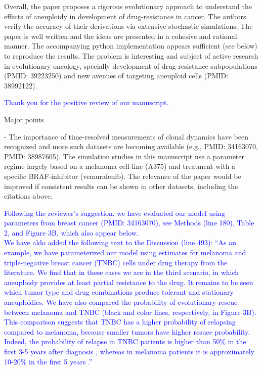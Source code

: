 \documentclass[12pt]{extarticle}
\begin{document}

Overall, the paper proposes a rigorous evolutionary approach to understand the effects of aneuploidy in development of drug-resistance in cancer. The authors verify the accuracy of their derivations via extensive stochastic simulations. The paper is well written and the ideas are presented in a cohesive and rational manner. The accompanying python implementation appears sufficient (see below) to reproduce the results. The problem is interesting and subject of active research in evolutionary oncology, specially development of drug-resistance subpopulations (PMID: 39223250) and new avenues of targeting aneuploid cells (PMID: 38992122).

\textcolor{blue}{Thank you for the positive review of our manuscript.}

Major points

- The importance of time-resolved measurements of clonal dynamics have been recognized and more such datasets are becoming available (e.g., PMID: 34163070, PMID: 38987605). The simulation studies in this manuscript use a parameter regime largely based on a melanoma cell-line (A375) and treatment with a specific BRAF-inhibitor (vemurafenib). The relevance of the paper would be improved if consistent results can be shown in other datasets, including the citations above.

\textcolor{blue}{Following the reviewer's suggestion, we have evaluated our model using parameters from breast cancer (PMID: 34163070), see Methods (line 180), Table 2, and Figure 3B, which also appear below.\\
We have aldo added the following text to the Discussion (line 493): ``As an example, we have parameterized our model using estimates for melanoma and triple-negative breast cancer (TNBC) cells under drug therapy from the literature. 
We find that in these cases we are in the third scenario, in which aneuploidy provides at least partial resistance to the drug. 
It remains to be seen which tumor type and drug combinations produce tolerant and stationary aneuploidies. %
We have also compared the probability of evolutionary rescue between melanoma and TNBC (black and color lines, respectively, in Figure 3B).
This comparison suggests that TNBC has a higher probability of relapsing compared to melanoma, because smaller tumors have higher resuce probability. Indeed, the probability of relapse in TNBC patients is higher than 50\% in the first 3-5 years after diagnosis \citep{taushanova2023synchronous}, whereas in melanoma patients it is approximately 10-20\% in the first 5 years \citep{wan2022prediction,von_schuckmann2019risk}.'' %
}%
\end{document}
